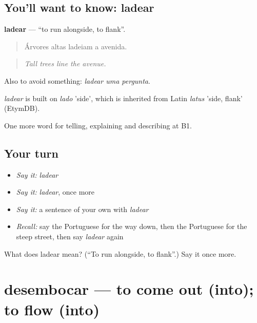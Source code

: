 \subsection*{You'll want to know: ladear}
\textbf{ladear} — \textquotedblleft{}to run alongside, to flank\textquotedblright{}.

\begin{quote}
Árvores altas ladeiam a avenida.
\end{quote}

\begin{quote}
\emph{Tall trees line the avenue.}
\end{quote}

Also to avoid something: \emph{ladear uma pergunta}.

\begin{cousinweb}
\emph{ladear} is built on \emph{lado} 'side', which is inherited from Latin \emph{latus} 'side, flank' (EtymDB).
\end{cousinweb}

\begin{grammarlens}[title={What you've built}]
One more word for telling, explaining and describing at B1.
\end{grammarlens}

\subsection*{Your turn}
\begin{itemize}
\raggedright
  \item \emph{Say it:} \emph{ladear}
  \item \emph{Say it:} \emph{ladear}, once more
  \item \emph{Say it:} a sentence of your own with \emph{ladear}
  \item \emph{Recall:} say the Portuguese for the way down, then the Portuguese for the steep street, then say \emph{ladear} again
\end{itemize}

\begin{tcolorbox}[breakable,colback=teal!4,colframe=teal!35!black,title={Before you move on}]
What does ladear mean? (\textquotedblleft{}To run alongside, to flank\textquotedblright{}.) Say it once more.
\end{tcolorbox}
\section[desembocar]{desembocar — to come out (into); to flow (into)}

